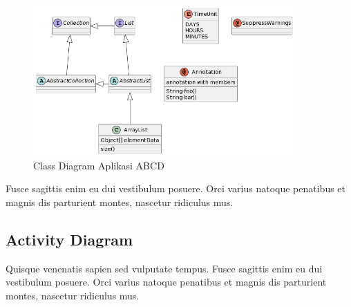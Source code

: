 \begin{figure}[H]
    \centering
    \includegraphics[width=10cm]{assets/pics/dummy-class-diagram.png}
    \caption{Class Diagram Aplikasi ABCD}
    \label{fig:classDiagram}
\end{figure}

Fusce sagittis enim eu dui vestibulum posuere. Orci varius natoque penatibus et magnis dis parturient montes, nascetur ridiculus mus.

\subsection{Activity Diagram}
Quisque venenatis sapien sed vulputate tempus. Fusce sagittis enim eu dui vestibulum posuere. Orci varius natoque penatibus et magnis dis parturient montes, nascetur ridiculus mus.

